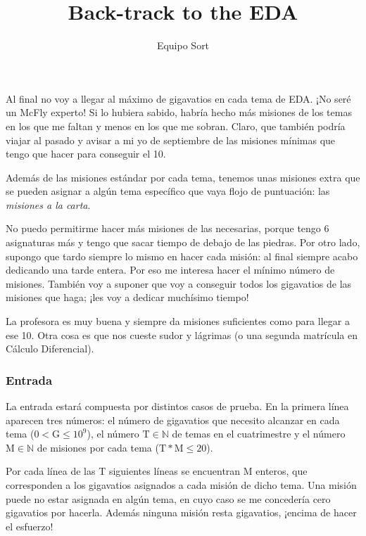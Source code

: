 \documentclass{article}
\title{Back-track to the EDA}
\author{Equipo Sort}
\date{}
\begin{document}
	\maketitle
	Al final no voy a llegar al máximo de gigavatios en cada tema de EDA. ¡No seré un McFly experto! Si lo hubiera sabido, habría hecho más misiones de los temas en los que me faltan y menos en los que me sobran. Claro, que también podría viajar al pasado y avisar a mi yo de septiembre de las misiones mínimas que tengo que hacer para conseguir el 10.
	
	
	Además de las misiones estándar por cada tema, tenemos unas misiones extra que se pueden asignar a algún tema específico que vaya flojo de puntuación: las \textit{misiones a la carta}.
	
	No puedo permitirme hacer más misiones de las necesarias, porque tengo 6 asignaturas más y tengo que sacar tiempo de debajo de las piedras. Por otro lado, supongo que tardo siempre lo mismo en hacer cada misión: al final siempre acabo dedicando una tarde entera. Por eso me interesa hacer el mínimo número de misiones. También voy a suponer que voy a conseguir todos los gigavatios de las misiones que haga; ¡les voy a dedicar muchísimo tiempo!
	
	La profesora es muy buena y siempre da misiones suficientes como para llegar a ese 10. Otra cosa es que nos cueste sudor y lágrimas (o una segunda matrícula en Cálculo Diferencial).\\
	
	\subsubsection*{Entrada}
	
	La entrada estará compuesta por distintos casos de prueba. En la primera línea aparecen tres números: el número de gigavatios que necesito alcanzar en cada tema ($0<\text{G}\leq 10^9$), el número $\text{T}\in\mathbb{N}$ de temas en el cuatrimestre y el número $\text{M}\in\mathbb{N}$ de misiones por cada tema ($\text{T}*\text{M}\leq20$).
	
	Por cada línea de las T siguientes líneas se encuentran M enteros, que corresponden a los gigavatios asignados a cada misión de dicho tema. Una misión puede no estar asignada en algún tema, en cuyo caso se me concedería cero gigavatios por hacerla. Además ninguna misión resta gigavatios, ¡encima de hacer el esfuerzo!
	
\end{document}
